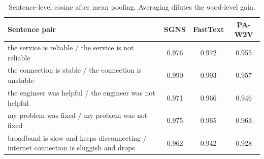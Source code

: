 \begin{table}[H]
\centering
\footnotesize
\caption{Sentence-level cosine after mean pooling. Averaging dilutes the word-level gain.}
\label{tab:w2vprobe}
\begin{tabular}{p{7.2cm}ccc}
\toprule
Sentence pair & SGNS & FastText & PA-W2V \\
\midrule
the service is reliable / the service is not reliable & 0.976 & 0.972 & 0.955 \\
the connection is stable / the connection is unstable & 0.990 & 0.993 & 0.957 \\
the engineer was helpful / the engineer was not helpful & 0.971 & 0.966 & 0.946 \\
my problem was fixed / my problem was not fixed & 0.975 & 0.965 & 0.963 \\
broadband is slow and keeps disconnecting / internet connection is sluggish and drops & 0.962 & 0.942 & 0.928 \\
\bottomrule
\end{tabular}
\end{table}